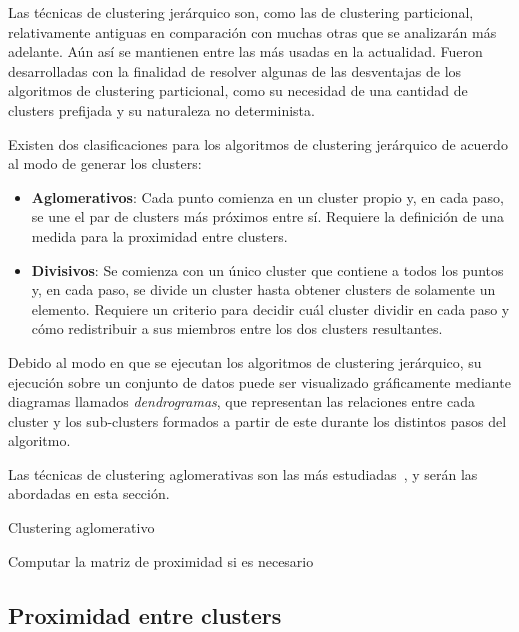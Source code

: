 Las técnicas de clustering jerárquico son, como las de clustering particional, relativamente antiguas en comparación con muchas otras que se analizarán más adelante.
Aún así se mantienen entre las más usadas en la actualidad.
Fueron desarrolladas con la finalidad de resolver algunas de las desventajas de los algoritmos de clustering particional, como su necesidad de una cantidad de clusters prefijada y su naturaleza no determinista.

Existen dos clasificaciones para los algoritmos de clustering jerárquico de acuerdo al modo de generar los clusters:

\begin{itemize}
    \item \textbf{Aglomerativos}: Cada punto comienza en un cluster propio y, en cada paso, se une el par de clusters más próximos entre sí.
    Requiere la definición de una medida para la proximidad entre clusters.
    \item \textbf{Divisivos}: Se comienza con un único cluster que contiene a todos los puntos y, en cada paso, se divide un cluster hasta obtener clusters de solamente un elemento.
    Requiere un criterio para decidir cuál cluster dividir en cada paso y cómo redistribuir a sus miembros entre los dos clusters resultantes.
\end{itemize}

Debido al modo en que se ejecutan los algoritmos de clustering jerárquico, su ejecución sobre un conjunto de datos puede ser visualizado gráficamente mediante diagramas llamados \textit{dendrogramas}, que representan las relaciones entre cada cluster y los sub-clusters formados a partir de este durante los distintos pasos del algoritmo.

Las técnicas de clustering aglomerativas son las más estudiadas~\cite{Tan05}, y serán las abordadas en esta sección.

\begin{algorithm}
    \caption{Clustering aglomerativo}
    \label{algorithm:clusteringAglomerativo}
    Computar la matriz de proximidad si es necesario\;
\end{algorithm}

\subsection{Proximidad entre clusters}\label{subsec:proximidadEntreClusters}

